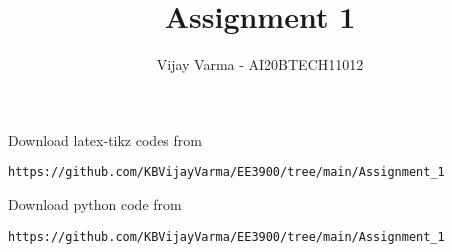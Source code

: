 \documentclass[journal,12pt,twocolumn]{IEEEtran}
\DeclareMathOperator*{\Res}{Res}
\begin{document}
\newcommand{\BEQA}{\begin{eqnarray}}
\newcommand{\EEQA}{\end{eqnarray}}
\newcommand{\define}{\stackrel{\triangle}{=}}

\raggedbottom
\setlength{\parindent}{0pt}
\providecommand{\mbf}{\mathbf}
\providecommand{\pr}[1]{\ensuremath{\Pr\left(#1\right)}}
\providecommand{\qfunc}[1]{\ensuremath{Q\left(#1\right)}}
\providecommand{\sbrak}[1]{\ensuremath{{}\left[#1\right]}}
\providecommand{\lsbrak}[1]{\ensuremath{{}\left[#1\right.}}
\providecommand{\rsbrak}[1]{\ensuremath{{}\left.#1\right]}}
\providecommand{\brak}[1]{\ensuremath{\left(#1\right)}}
\providecommand{\lbrak}[1]{\ensuremath{\left(#1\right.}}
\providecommand{\rbrak}[1]{\ensuremath{\left.#1\right)}}
\providecommand{\cbrak}[1]{\ensuremath{\left\{#1\right\}}}
\providecommand{\lcbrak}[1]{\ensuremath{\left\{#1\right.}}
\providecommand{\rcbrak}[1]{\ensuremath{\left.#1\right\}}}
\theoremstyle{remark}
\newtheorem{rem}{Remark}
\newcommand{\sgn}{\mathop{\mathrm{sgn}}}
\providecommand{\abs}[1]{\vert#1\vert}
\providecommand{\res}[1]{\Res\displaylimits_{#1}} 
\providecommand{\norm}[1]{\lVert#1\rVert}
\providecommand{\mtx}[1]{\mathbf{#1}}
\providecommand{\mean}[1]{E[ #1 ]}
\providecommand{\fourier}{\overset{\mathcal{F}}{ \rightleftharpoons}}
\providecommand{\system}{\overset{\mathcal{H}}{ \longleftrightarrow}}
\newcommand{\solution}{\noindent \textbf{Solution: }}
\newcommand{\cosec}{\,\text{cosec}\,}
\providecommand{\dec}[2]{\ensuremath{\overset{#1}{\underset{#2}{\gtrless}}}}
\newcommand{\myvec}[1]{\ensuremath{\begin{pmatrix}#1\end{pmatrix}}}
\newcommand{\mydet}[1]{\ensuremath{\begin{vmatrix}#1\end{vmatrix}}}
\makeatletter
{}
\makeatother
\let\StandardTheFigure\thefigure
\let\vec\mathbf
\renewcommand{\thefigure}{\theproblem}
\def\putbox#1#2#3{\makebox[0in][l]{\makebox[#1][l]{}\raisebox{\baselineskip}[0in][0in]{\raisebox{#2}[0in][0in]{#3}}}}
     \def\rightbox#1{\makebox[0in][r]{#1}}
     \def\centbox#1{\makebox[0in]{#1}}
     \def\topbox#1{\raisebox{-\baselineskip}[0in][0in]{#1}}
     \def\midbox#1{\raisebox{-0.5\baselineskip}[0in][0in]{#1}}
\vspace{3cm}
\title{Assignment 1}
\author{Vijay Varma - AI20BTECH11012}
\maketitle
\newpage
\bigskip
\renewcommand{\thefigure}{\theenumi}
\renewcommand{\thetable}{\theenumi}
%
Download latex-tikz codes from 
%
\begin{lstlisting}
https://github.com/KBVijayVarma/EE3900/tree/main/Assignment_1
\end{lstlisting}
%
Download python code from 
%
\begin{lstlisting}
https://github.com/KBVijayVarma/EE3900/tree/main/Assignment_1
\end{lstlisting}
\end{document}
